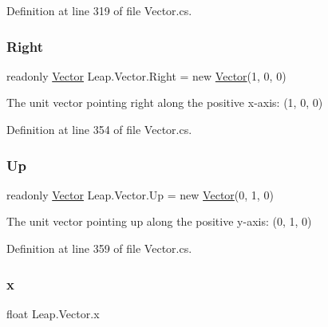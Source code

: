 Definition at line 319 of file Vector.\+cs.

\mbox{\label{struct_leap_1_1_vector_aa2cefa3d6f93e552fcd95621e82da158}} 
\subsubsection{\texorpdfstring{Right}{Right}}
{\footnotesize\ttfamily readonly \mbox{\hyperlink{struct_leap_1_1_vector}{Vector}} Leap.\+Vector.\+Right = new \mbox{\hyperlink{struct_leap_1_1_vector}{Vector}}(1, 0, 0)\hspace{0.3cm}{\ttfamily [static]}}



The unit vector pointing right along the positive x-\/axis\+: (1, 0, 0) 



Definition at line 354 of file Vector.\+cs.

\mbox{\label{struct_leap_1_1_vector_ad90a5266422b507db81c857829b9a915}} 
\subsubsection{\texorpdfstring{Up}{Up}}
{\footnotesize\ttfamily readonly \mbox{\hyperlink{struct_leap_1_1_vector}{Vector}} Leap.\+Vector.\+Up = new \mbox{\hyperlink{struct_leap_1_1_vector}{Vector}}(0, 1, 0)\hspace{0.3cm}{\ttfamily [static]}}



The unit vector pointing up along the positive y-\/axis\+: (0, 1, 0) 



Definition at line 359 of file Vector.\+cs.

\mbox{\label{struct_leap_1_1_vector_aa567a19970c776ccb9ebe9a09cb14828}} 
\subsubsection{\texorpdfstring{x}{x}}
{\footnotesize\ttfamily float Leap.\+Vector.\+x}



